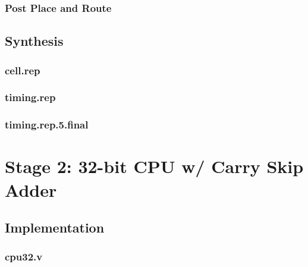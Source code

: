 \documentclass[11pt,letterpaper,final]{article}
\begin{document}
\subsubsection{Post Place and Route}
\label{s1/postpr}
\begin{scriptsize}
\end{scriptsize}

\subsection{Synthesis}
\subsubsection{cell.rep}
\label{s1/cell.rep}
\begin{scriptsize}
\end{scriptsize}
\subsubsection{timing.rep}
\label{s1/timing.rep}
\begin{scriptsize}
\end{scriptsize}
\subsubsection{timing.rep.5.final}
\label{s1/timing.rep.5.final}
\begin{scriptsize}
\end{scriptsize}

\section{ Stage 2: 32-bit CPU w/ Carry Skip Adder }

\subsection{Implementation}
\subsubsection{cpu32.v}
\label{s2/cpu32.v}
\begin{scriptsize}
\end{scriptsize}
\end{document}
